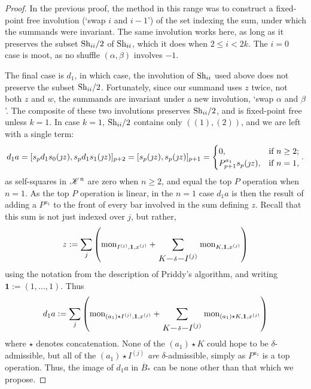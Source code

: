 \documentclass[11pt]{article}
\makeatletter
\newcommand{\LL}[1]{{\scrK}^{#1}}%
\newcommand{\produces}[3]{{#1}{#3}{#2}}
\newcommand{\BarMonomial}[3]{\textup{mon}_{#1,#2,#3}}
\newcommand{\Shuffles}[2]{\textup{Sh}_{#1#2}}
\newcommand{\HalfShuffles}[2]{\textup{Sh}_{#1#2}/2}
\renewcommand{\produces}[3]{
{
\def\labelstyle{\scriptstyle}
\xymatrix@C=2em@1{
{#1}
\ar@{-}[r]|-{{\,#3\,}}
&%
{#2}%
}}}
\makeatother
\begin{document}
\begin{LieLambdaStructureOnKoszul}
\begin{proof}
In the previous proof, the method in this range was to construct a fixed-point free involution (`swap $i$ and $i-1$') of the set indexing the sum, under which the summands were invariant. The same involution works here, as long as it preserves the subset $\HalfShuffles{i}{i}$ of $\Shuffles{i}{i}$, which it does when $2\leq i<2k$. The $i=0$ case is moot, as no shuffle $(\alpha,\beta)$ involves $-1$.


The final case is $d_1$, in which case, the involution of $\Shuffles{i}{i}$ used above does not preserve the subset $\HalfShuffles{i}{i}$. Fortunately, since our summand uses $z$ twice, not both $z$ and $w$, the summands are invariant under a new involution, `swap $\alpha$ and $\beta$'. The composite of these two involutions preserves $\HalfShuffles{i}{i}$, and is fixed-point free unless $k=1$. In case $k=1$, $\HalfShuffles{i}{i}$ contains only $((1),(2))$, and we are left with a single term:
\[d_1a=[s_{p}d_1s_0(\jmath z), s_{p}d_1s_1(\jmath z)]_{p+2}=[s_{p}(\jmath z), s_{p}(\jmath z)]_{p+1}=\begin{cases}
0,&\textup{if }n\geq2;\\
P^{a_1}_{p+1}s_{p}(\jmath z),&\textup{if }n=1,
\end{cases}
.\]
as self-squares in $\LL{n}$ are zero when $n\geq2$, and equal the top $P$ operation when $n=1$. As the top $P$ operation is linear, in the $n=1$ case $d_1a$ is then the result of adding a $P^{a_1}$ to the front of every bar involved in the sum defining $z$. Recall that this sum is not just indexed over $j$, but rather,
\[z:=\sum_j\left(\BarMonomial{I^{(j)}}{\textbf{1}}{x^{(j)}}+\sum_{\produces{K}{I^{(j)}}{\delta}}\BarMonomial{K}{\textbf{1}}{x^{(j)}}\right)\]
using the notation from the description of Priddy's algorithm, and writing $\textbf{1}:=(1,\ldots,1)$. Thus
\[d_1a:=\sum_j\left(\BarMonomial{(a_1)\star I^{(j)}}{\textbf{1}}{x^{(j)}}+\sum_{\produces{K}{I^{(j)}}{\delta}}\BarMonomial{(a_1)\star K}{\textbf{1}}{x^{(j)}}\right)\]
where $\star$ denotes concatenation. None of the $(a_1)\star K$ could hope to be $\delta$-admissible, but all of the $(a_1)\star I^{(j)}$ \emph{are} $\delta$-admissible, simply as $P^{a_1}$ is a top operation. Thus, the image of $d_1a$ in $\overline{B}_*$ can be none other than that which we propose.

\end{proof}
\end{LieLambdaStructureOnKoszul}
\end{document}
